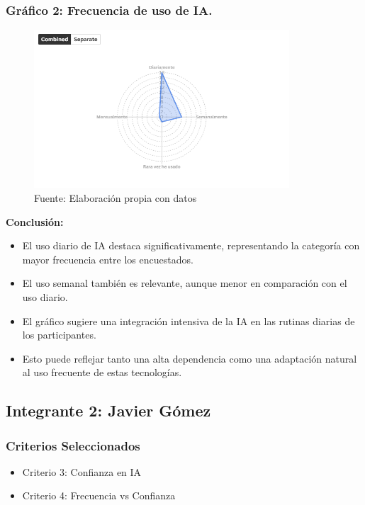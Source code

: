 \documentclass[12pt, a4paper]{article}
\begin{document}
\subsubsection*{Gráfico 2: Frecuencia de uso de IA.}
\begin{figure}[H]
    \centering
    \includegraphics[width=0.85\textwidth]{Graficos/Radar_frec_ia_FC.png}
    \caption[2]{Fuente: Elaboración propia con datos}
\end{figure}

\textbf{Conclusión:}
\begin{itemize}
    \item El uso diario de IA destaca significativamente, representando la categoría con mayor frecuencia entre los encuestados.
    \item El uso semanal también es relevante, aunque menor en comparación con el uso diario.
    \item El gráfico sugiere una integración intensiva de la IA en las rutinas diarias de los participantes.
    \item Esto puede reflejar tanto una alta dependencia como una adaptación natural al uso frecuente de estas tecnologías.
\end{itemize}


\newpage
\subsection*{Integrante 2: Javier Gómez}

\subsubsection*{Criterios Seleccionados}
\begin{itemize}
    \item Criterio 3: Confianza en IA
    \item Criterio 4: Frecuencia vs Confianza
\end{itemize}
\end{document}
